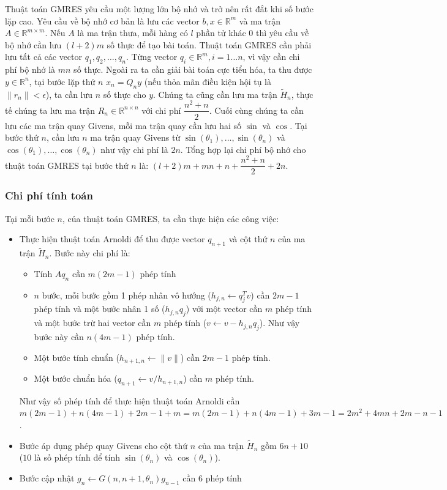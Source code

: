 \documentclass[14pt, a4paper]{article}
\numberwithin{equation}{section}
\numberwithin{algorithm}{section}
\numberwithin{figure}{section}
\numberwithin{dl}{section}
\numberwithin{md}{section}
\numberwithin{bd}{section}
\begin{document}
Thuật toán GMRES yêu cầu một lượng lớn bộ nhớ và trở nên rất đắt khi số bước lặp cao.
Yêu cầu về bộ nhớ cơ bản là lưu các vector $b, x \in \mathbb{R}^{m}$ và ma trận $A \in \mathbb{R}^{m \times m}$. Nếu $A$ là ma trận thưa, mỗi hàng có $l$ phần tử khác 0 thì yêu cầu về bộ nhớ cần lưu $(l+2)m$ số thực để tạo bài toán. Thuật toán GMRES cần phải lưu tất cả các vector $q_1, q_2, \dots, q_n$. Từng vector $q_i \in \mathbb{R}^{m}, i=1\dots n$, vì vậy cần chi phí bộ nhớ là $mn$ số thực.
Ngoài ra ta cần giải bài toán cực tiểu hóa, ta thu được $y \in \mathbb{R}^n$, tại bước lặp thứ $n$ $x_n = Q_n y$ (nếu thỏa mãn điều kiện hội tụ là $\lVert r_n \rVert < \epsilon$), ta cần lưu $n$ số thực cho $y$.
Chúng ta cũng cần lưu ma trận $\widetilde{H}_n$, thực tế chúng ta lưu ma trận $R_n \in \mathbb{R}^{n \times n}$ với chi phí $\dfrac{n^2 + n}{2}$.
Cuối cùng chúng ta cần lưu các ma trận quay Givens, mỗi ma trận quay cần lưu hai số $\sin$ và $\cos$. Tại bước thứ $n$, cần lưu $n$ ma trận quay Givens từ $\sin(\theta_1),\dots, \sin(\theta_n)$ và $\cos(\theta_1),\dots,\cos(\theta_n)$ như vậy chi phí là $2n$.
Tổng hợp lại chi phí bộ nhớ cho thuật toán GMRES tại bước thứ $n$ là: $(l+2)m + mn + n + \dfrac{n^2 + n}{2} + 2n$.

\subsubsection{Chi phí tính toán}

Tại mỗi bước $n$, của thuật toán GMRES, ta cần thực hiện các công việc:

\begin{itemize}
    \item Thực hiện thuật toán Arnoldi để thu được vector $q_{n+1}$ và cột thứ $n$ của ma trận $\widetilde{H}_n$. Bước này chi phí là: \begin{itemize}
        \item Tính $Aq_n$ cần $m(2m-1)$ phép tính
        \item $n$ bước, mỗi bước gồm 1 phép nhân vô hướng ($h_{j,n} \leftarrow q_j^Tv$) cần $2m-1$ phép tính và một bước nhân 1 số ($h_{j,n}q_j$) với một vector cần $m$ phép tính và một bước trừ hai vector cần $m$ phép tính ($v \leftarrow v - h_{j,n}q_j$). Như vậy bước này cần $n(4m-1)$ phép tính.
        \item Một bước tính chuẩn ($h_{n+1,n} \leftarrow \lVert v \rVert$) cần $2m-1$ phép tính.
        \item Một bước chuẩn hóa ($q_{n+1} \leftarrow v/h_{n+1,n}$) cần $m$ phép tính.
    \end{itemize}
    Như vậy số phép tính để thực hiện thuật toán Arnoldi cần $m(2m-1) + n(4m-1) + 2m-1 + m=m(2m-1) + n(4m-1)+ 3m-1=2m^2+4mn+2m-n-1$.
    \item Bước áp dụng phép quay Givens cho cột thứ $n$ của ma trận $\widetilde{H}_n$ gồm $6n+10$ ($10$ là số phép tính để tính $\sin(\theta_n)$ và $\cos(\theta_n)$).
    \item Bước cập nhật $g_n \leftarrow G(n, n+1, \theta_n)g_{n-1}$ cần 6 phép tính
\end{itemize}
\end{document}
